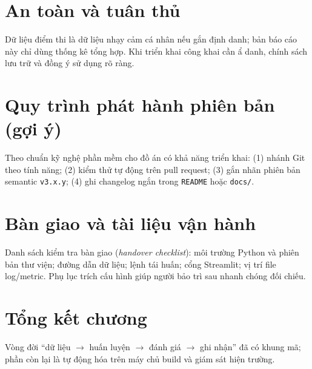 \section{An toàn và tuân thủ}
Dữ liệu điểm thi là dữ liệu nhạy cảm cá nhân nếu gắn định danh; bản báo cáo này chỉ dùng thống kê tổng hợp. Khi triển khai công khai cần ẩ danh, chính sách lưu trữ và đồng ý sử dụng rõ ràng.

\section{Quy trình phát hành phiên bản (gợi ý)}
Theo chuẩn kỹ nghệ phần mềm cho đồ án có khả năng triển khai: (1) nhánh Git theo tính năng; (2) kiểm thử tự động trên pull request; (3) gắn nhãn phiên bản semantic \texttt{v3.x.y}; (4) ghi changelog ngắn trong \texttt{README} hoặc \texttt{docs/}.

\section{Bàn giao và tài liệu vận hành}
Danh sách kiểm tra bàn giao (\textit{handover checklist}): môi trường Python và phiên bản thư viện; đường dẫn dữ liệu; lệnh tái huấn; cổng Streamlit; vị trí file log/metric. Phụ lục trích cấu hình giúp người bảo trì sau nhanh chóng đối chiếu.

\section{Tổng kết chương}
Vòng đời ``dữ liệu $\rightarrow$ huấn luyện $\rightarrow$ đánh giá $\rightarrow$ ghi nhận'' đã có khung mã; phần còn lại là tự động hóa trên máy chủ build và giám sát hiện trường.
